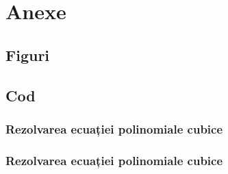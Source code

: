 \appendix

\chapter{Anexe}

\section{Figuri}

\clearpage


\section{Cod}

\subsection{Rezolvarea ecuației polinomiale cubice}



\clearpage


\subsection{Rezolvarea ecuației polinomiale cubice}



\clearpage